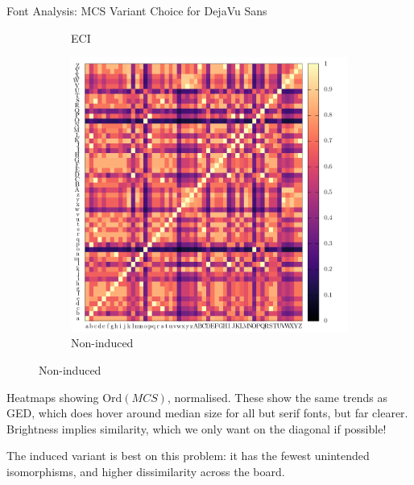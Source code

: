 \begin{frame}{Font Analysis: MCS Variant Choice for DejaVu Sans}
\begin{figure}
\begin{subfigure}[b]{0.3\linewidth}
			\caption{
				ECI
				\label{fig:heat:filter:eci}
			}
		\end{subfigure}
		\begin{subfigure}[b]{0.3\linewidth}
			\includegraphics[width=\linewidth, height=0.9\linewidth]{../tables/dejavu-sans/edgecountdec-conf-nrm.pdf}
			\caption{
				Non-induced
				\label{fig:heat:filter:non-ind}
			}
		\end{subfigure}
	\end{figure}

	Heatmaps showing $\text{Ord}(\textit{MCS})$, normalised.
	These show the same trends as GED, which does hover around median size for all but serif fonts, but far clearer.
	Brightness implies similarity, which we only want on the diagonal if possible!
	
	The \alert{induced variant is best on this problem}: it has the fewest unintended isomorphisms, and higher dissimilarity across the board.
\end{frame}

